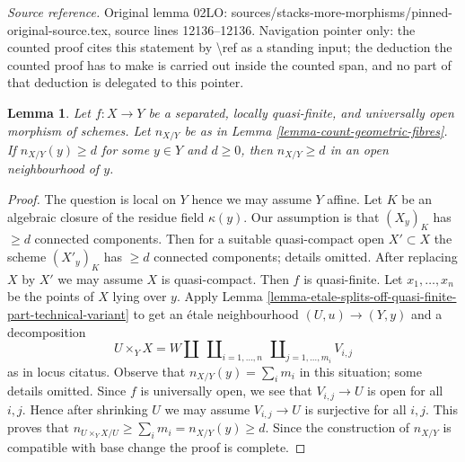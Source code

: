 \documentclass[10pt,a4paper]{amsart}
\theoremstyle{plain}
\newtheorem{lemma}[subsection]{Lemma}
\theoremstyle{definition}
\theoremstyle{remark}
\numberwithin{equation}{subsection}
\begin{document}
\noindent\textit{Source reference.} Original lemma 02LO: sources/stacks-more-morphisms/pinned-original-source.tex, source lines 12136--12136. Navigation pointer only: the counted proof cites this statement by \textbackslash{}ref as a standing input; the deduction the counted proof has to make is carried out inside the counted span, and no part of that deduction is delegated to this pointer.\par\medskip
\begin{lemma}
\label{lemma-count-geometric-fibres-universally-open}
Let $f : X \to Y$ be a separated, locally quasi-finite, and universally open
morphism of schemes. Let $n_{X/Y}$ be as in
Lemma \ref{lemma-count-geometric-fibres}.
If $n_{X/Y}(y) \geq d$ for some $y \in Y$ and $d \geq 0$,
then $n_{X/Y} \geq d$ in an open neighbourhood of $y$.
\end{lemma}

\begin{proof}
The question is local on $Y$ hence we may assume $Y$ affine.
Let $K$ be an algebraic closure of the residue field $\kappa(y)$.
Our assumption is that $(X_y)_K$ has $\geq d$ connected components.
Then for a suitable quasi-compact open $X' \subset X$
the scheme $(X'_y)_K$ has $\geq d$ connected components; details omitted.
After replacing $X$ by $X'$ we may assume $X$ is quasi-compact.
Then $f$ is quasi-finite. Let $x_1, \ldots, x_n$ be the points of $X$
lying over $y$. Apply
Lemma \ref{lemma-etale-splits-off-quasi-finite-part-technical-variant}
to get an \'etale neighbourhood $(U, u) \to (Y, y)$ and a decomposition
$$
U \times_Y X =
W \amalg
\ \coprod\nolimits_{i = 1, \ldots, n}
\ \coprod\nolimits_{j = 1, \ldots, m_i}
V_{i, j}
$$
as in locus citatus. Observe that $n_{X/Y}(y) = \sum_i m_i$
in this situation; some details omitted.
Since $f$ is universally open, we see
that $V_{i, j} \to U$ is open for all $i, j$. Hence after shrinking
$U$ we may assume $V_{i, j} \to U$ is surjective
for all $i, j$. This proves that
$n_{U \times_Y X/U} \geq \sum_i m_i = n_{X/Y}(y) \geq d$.
Since the construction of $n_{X/Y}$ is compatible with
base change the proof is complete.
\end{proof}
\end{document}
